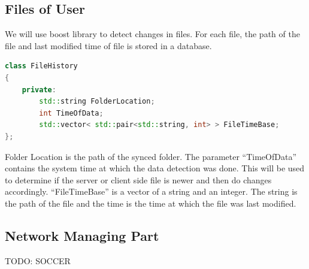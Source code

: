 \documentclass{article}
\begin{document}
			\subsection{Files of User}

			We will use boost library to detect changes in files. For each file, the path of the file and last modified time of file is stored in a database.

			\begin{lstlisting}[language=C++, caption={Class Parameters for File History}]
class FileHistory
{
	private:
		std::string FolderLocation;
		int TimeOfData;
		std::vector< std::pair<std::string, int> > FileTimeBase;
};
			\end{lstlisting}

			Folder Location is the path of the synced folder. The parameter ``TimeOfData'' contains the system time at which the data detection was done. This will be used to determine if the server or client side file is newer and then do changes accordingly. ``FileTimeBase'' is a vector of a string and an integer. The string is the path of the file and the time is the time at which the file was last modified.
			
			\newline
			\subsection{Network Managing Part}
				TODO: SOCCER  \newline
\end{document}
